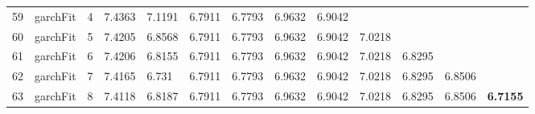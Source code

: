 \documentclass[10pt,a4paper]{article}
\begin{document}
\begin{table}[ht]
\begin{tabular}{rlrllllllllll}
  59 & garchFit &     4 & 7.4363 & 7.1191 & 6.7911 & 6.7793 & 6.9632 & 6.9042 &  &  &  &  \\ 
  60 & garchFit &     5 & 7.4205 & 6.8568 & 6.7911 & 6.7793 & 6.9632 & 6.9042 & 7.0218 &  &  &  \\ 
  61 & garchFit &     6 & 7.4206 & 6.8155 & 6.7911 & 6.7793 & 6.9632 & 6.9042 & 7.0218 & 6.8295 &  &  \\ 
  62 & garchFit &     7 & 7.4165 & 6.731 & 6.7911 & 6.7793 & 6.9632 & 6.9042 & 7.0218 & 6.8295 & 6.8506 &  \\ 
  63 & garchFit &     8 & 7.4118 & 6.8187 & 6.7911 & 6.7793 & 6.9632 & 6.9042 & 7.0218 & 6.8295 & 6.8506 & \textbf{6.7155} \\ 
   \hline
\end{tabular}
\end{table}
\end{document}
